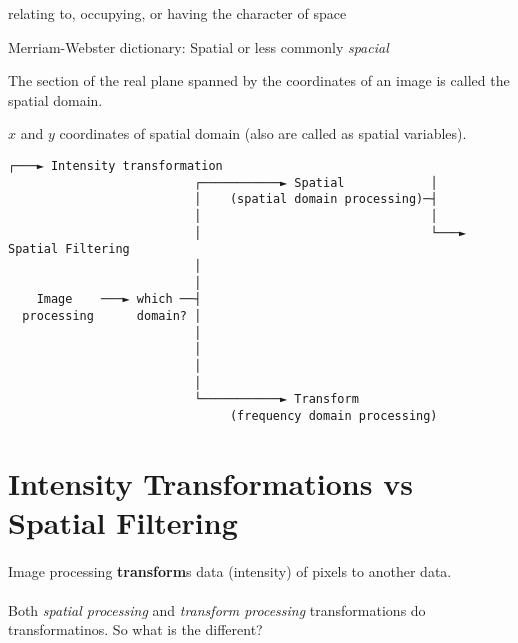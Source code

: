\begin{definition} [Spatial] \hfill
    relating to, occupying, or having the character of space
\end{definition}

Merriam-Webster dictionary: Spatial or less commonly \emph{spacial}

\begin{definition}  \hfill
    The section of the real plane spanned by the coordinates of an image is
    called the spatial domain.
\end{definition}

\begin{definition}  \hfill
    $x$ and $y$ coordinates of spatial domain (also are called as spatial
    variables).
\end{definition}

\begin{tiny}
  \begin{Verbatim}[fontfamily=myverbatimfont_for_box_characters]
                                                           ┌───► Intensity transformation
                          ┌───────────► Spatial            │
                          │    (spatial domain processing)─┤
                          │                                │
                          │                                └───► Spatial Filtering
                          │
                          │
    Image    ───► which ──┤
  processing      domain? │
                          │
                          │
                          │
                          │
                          └───────────► Transform
                               (frequency domain processing)
  \end{Verbatim}
\end{tiny}

\section{Intensity Transformations vs Spatial Filtering}



\paragraph*{} Image processing \textbf{transform}s data (intensity) of pixels to
another data.

\paragraph*{}Both \emph{spatial processing} and \emph{transform processing}
transformations do transformatinos. So what is the different? 

